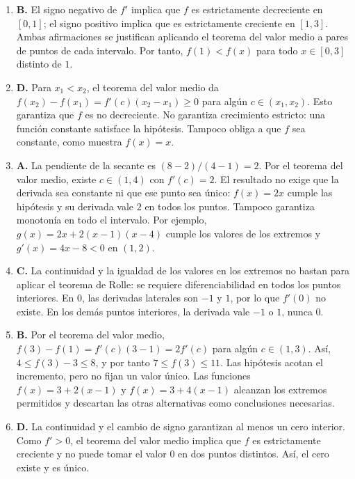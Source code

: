 \documentclass[10pt]{article}
\begin{document}
\begin{enumerate}
\item[\textbf{A1.}] \textbf{B.} El signo negativo de $f'$ implica que $f$
es estrictamente decreciente en $[0,1]$; el signo positivo implica que es
estrictamente creciente en $[1,3]$. Ambas afirmaciones se justifican
aplicando el teorema del valor medio a pares de puntos de cada intervalo.
Por tanto, $f(1)<f(x)$ para todo $x\in[0,3]$ distinto de $1$.

\item[\textbf{A2.}] \textbf{D.} Para $x_1<x_2$, el teorema del valor medio
da $f(x_2)-f(x_1)=f'(c)(x_2-x_1)\geq0$ para algún $c\in(x_1,x_2)$.
Esto garantiza que $f$ es no decreciente. No garantiza crecimiento
estricto: una función constante satisface la hipótesis. Tampoco obliga
a que $f$ sea constante, como muestra $f(x)=x$.

\item[\textbf{A3.}] \textbf{A.} La pendiente de la secante es
$(8-2)/(4-1)=2$. Por el teorema del valor medio, existe $c\in(1,4)$
con $f'(c)=2$. El resultado no exige que la derivada sea constante ni
que ese punto sea único: $f(x)=2x$ cumple las hipótesis y su derivada
vale $2$ en todos los puntos. Tampoco garantiza monotonía en todo el
intervalo. Por ejemplo, $g(x)=2x+2(x-1)(x-4)$ cumple los valores de los
extremos y $g'(x)=4x-8<0$ en $(1,2)$.

\item[\textbf{A4.}] \textbf{C.} La continuidad y la igualdad de los valores
en los extremos no bastan para aplicar el teorema de Rolle: se requiere
diferenciabilidad en todos los puntos interiores. En $0$, las derivadas
laterales son $-1$ y $1$, por lo que $f'(0)$ no existe. En los demás
puntos interiores, la derivada vale $-1$ o $1$, nunca $0$.

\item[\textbf{A5.}] \textbf{B.} Por el teorema del valor medio,
$f(3)-f(1)=f'(c)(3-1)=2f'(c)$ para algún $c\in(1,3)$. Así,
$4\leq f(3)-3\leq8$, y por tanto $7\leq f(3)\leq11$.
Las hipótesis acotan el incremento, pero no fijan un valor único.
Las funciones $f(x)=3+2(x-1)$ y $f(x)=3+4(x-1)$ alcanzan los extremos
permitidos y descartan las otras alternativas como conclusiones necesarias.

\item[\textbf{A6.}] \textbf{D.} La continuidad y el cambio de signo
garantizan al menos un cero interior. Como $f'>0$, el teorema del valor
medio implica que $f$ es estrictamente creciente y no puede tomar el
valor $0$ en dos puntos distintos. Así, el cero existe y es único.
\end{enumerate}
\end{document}
